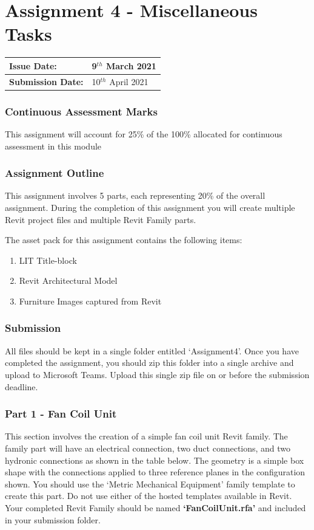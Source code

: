 
	
\part*{Assignment 4 - Miscellaneous Tasks}

\begin{tabularx}{\textwidth}{ |X|X| }
	\hline
	\textbf{Issue Date:} & 9$^{th}$ March 2021\\
	\hline 
	\textbf{Submission Date:}  & 10$^{th}$ April 2021\\
	\hline
\end{tabularx}

\section*{Continuous Assessment Marks}
This assignment will account for 25\% of the 100\% allocated for continuous assessment in this module

\section*{Assignment Outline}
This assignment involves 5 parts, each representing 20\% of the overall assignment. During the completion of this assignment you will create multiple Revit project files and multiple Revit Family parts.


The asset pack for this assignment contains the following items:
\begin{enumerate}
	\item LIT Title-block
	\item Revit Architectural Model
	\item Furniture Images captured from Revit
\end{enumerate}


\section*{Submission}
All files should be kept in a single folder entitled ‘Assignment4’. Once you have completed the assignment, you should zip this folder into a single archive and upload to Microsoft Teams. Upload this single zip file on or before the submission deadline.





\newpage

\section*{Part 1 - Fan Coil Unit}
This section involves the creation of a simple fan coil unit Revit family. The family part will have an electrical connection, two duct connections, and two hydronic connections as shown in the table below. The geometry is a simple box shape with the connections applied to three reference planes in the configuration shown. You should use the ‘Metric Mechanical Equipment’ family template to create this part. Do not use either of the hosted templates available in Revit.  Your completed Revit Family should be named \textbf{‘FanCoilUnit.rfa’} and included in your submission folder.\\

